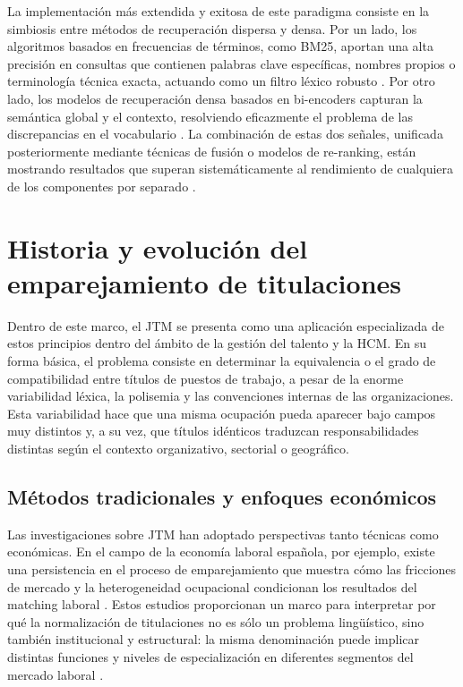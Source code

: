 La implementación más extendida y exitosa de este paradigma consiste en la simbiosis entre métodos de recuperación dispersa y densa. Por un lado, los algoritmos basados en frecuencias de términos, como \gls{BM25}, aportan una alta precisión en consultas que contienen palabras clave específicas, nombres propios o terminología técnica exacta, actuando como un filtro léxico robusto \cite{robertson2009probabilistic}. Por otro lado, los modelos de recuperación densa basados en bi-encoders capturan la semántica global y el contexto, resolviendo eficazmente el problema de las discrepancias en el vocabulario \cite{karpukhin2020dense}. La combinación de estas dos señales, unificada posteriormente mediante técnicas de fusión o modelos de re-ranking, están mostrando resultados que superan sistemáticamente al rendimiento de cualquiera de los componentes por separado \cite{luan2021sparse,gao2021coil}.

\section{Historia y evolución del emparejamiento de titulaciones}
\label{sec:JobTitleMatching}

\noindent Dentro de este marco, el \gls{JTM} se presenta como una aplicación especializada de estos principios dentro del ámbito de la gestión del talento y la \gls{HCM}. En su forma básica, el problema consiste en determinar la equivalencia o el grado de compatibilidad entre títulos de puestos de trabajo, a pesar de la enorme variabilidad léxica, la polisemia y las convenciones internas de las organizaciones. Esta variabilidad hace que una misma ocupación pueda aparecer bajo campos muy distintos y, a su vez, que títulos idénticos traduzcan responsabilidades distintas según el contexto organizativo, sectorial o geográfico.

\subsection{Métodos tradicionales y enfoques económicos}

\noindent Las investigaciones sobre \gls{JTM} han adoptado perspectivas tanto técnicas como económicas. En el campo de la economía laboral española, por ejemplo, existe una persistencia en el proceso de emparejamiento que muestra cómo las fricciones de mercado y la heterogeneidad ocupacional condicionan los resultados del matching laboral \cite{de2008funcion}. Estos estudios proporcionan un marco para interpretar por qué la normalización de titulaciones no es sólo un problema lingüístico, sino también institucional y estructural: la misma denominación puede implicar distintas funciones y niveles de especialización en diferentes segmentos del mercado laboral \cite{de2017quien}.

